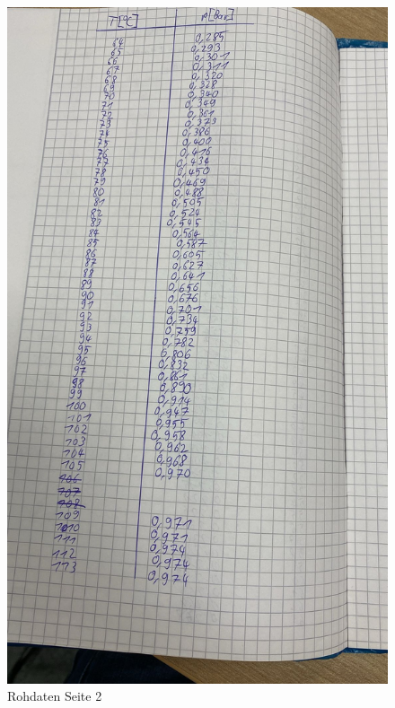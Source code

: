 \begin{figure}
  \centering
  \includegraphics[width=\textwidth, angle=270]{Bilder/data2.jpg}
  \caption{Rohdaten Seite 2}
  \label{fig:Data2}
\end{figure}

